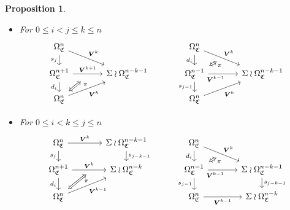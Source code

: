 \documentclass[a4paper,10pt
]{article}%
\numberwithin{equation}{section}
\numberwithin{figure}{section}
\newtheorem{proposition}[equation]{Proposition}%
\theoremstyle{definition} %
\newcommand{\1}{\ensuremath{\mathbbm 1}}%
\begin{document}
\begin{proposition}
\begin{itemize}
		\item[(DF3)]
		For $0\leq i < j \leq k \leq n$
		\begin{equation}
		\begin{tikzcd}[row sep = 12pt, column sep = 35pt]
		\Omega^n_{\mathfrak{C}}
		\arrow{dr}[swap,name=U]{}{\boldsymbol{V}^k} \arrow{d}[swap]{s_j} &
		&
		\Omega^n_{\mathfrak{C}}
		\arrow{dr}[swap,name=UUU]{}{\boldsymbol{V}^k} \arrow{d}[swap]{d_{i}} &
		\\
		|[alias=V]|
		\Omega^{n+1}_{\mathfrak{C}} \ar{r}{\boldsymbol{V}^{k+1}}[swap,name=UU]{} \arrow{d}[swap]{d_i}&
		\Sigma \wr \Omega^{n-k-1}_{\mathfrak{C}}
		&
		|[alias=VVV]|
		\Omega^{n-1}_{\mathfrak{C}} \ar{r}[near start, swap]{\boldsymbol{V}^{k-1}}[swap,name=UUUU]{} \ar{d}[swap]{s_{j-1}} &
		\Sigma \wr \Omega^{n-k-1}_{\mathfrak{C}}
		\\
		|[alias=VV]|
		\Omega^{n}_{\mathfrak{C}} \arrow{ur}[swap]{\boldsymbol{V}^k} &
		&
		|[alias=VVVV]|
		\Omega^{n}_{\mathfrak{C}} \arrow{ur}[swap]{\boldsymbol{V}^k} &
		\arrow[Leftrightarrow, from=VV, to=UU,shorten >=0.25cm,shorten <=0.05cm
		,swap,near end,"\pi"
		]
		\arrow[Leftrightarrow, from=VVV, to=UUU,shorten >=0.05cm,shorten <=0.05cm
		,swap,near end,"\pi"
		]
		\end{tikzcd}
		\end{equation}
		
		\item[(DF4)]
		For $0 \leq i < k \leq j \leq n$
		\begin{equation}
		\begin{tikzcd}[row sep = 12pt, column sep = 35pt]
		\Omega^n_{\mathfrak{C}}
		\arrow{r}[swap,name=U]{}{\boldsymbol{V}^k} \arrow{d}[swap]{s_j} &
		\Sigma \wr \Omega^{n-k-1}_{\mathfrak{C}} \ar{d}{s_{j-k-1}}
		&
		\Omega^n_{\mathfrak{C}}
		\arrow{dr}[swap,name=UUU]{}{\boldsymbol{V}^k} \arrow{d}[swap]{d_i} &
		\\
		|[alias=V]|
		\Omega^{n+1}_{\mathfrak{C}} \ar{r}{\boldsymbol{V}^{k}}[swap,name=UU]{} \arrow{d}[swap]{d_i}&
		\Sigma \wr \Omega^{n-k}_{\mathfrak{C}}
		&
		|[alias=VVV]|
		\Omega^{n-1}_{\mathfrak{C}} \ar{r}[near start, swap]{\boldsymbol{V}^{k-1}}[swap,name=UUUU]{} \ar{d}[swap]{s_{j-1}} &
		\Sigma \wr \Omega^{n-k-1}_{\mathfrak{C}} \ar{d}{s_{j-k-1}}
		\\
		|[alias=VV]|
		\Omega^{n}_{\mathfrak{C}} \arrow{ur}[swap]{\boldsymbol{V}^{k-1}} &
		&
		|[alias=VVVV]|
		\Omega^{n}_{\mathfrak{C}} \ar{r}[swap]{\boldsymbol{V}^{k-1}} &
		\Sigma \wr \Omega^{n-k}_{\mathfrak{C}}
		\arrow[Leftrightarrow, from=VV, to=UU,shorten >=0.05cm,shorten <=0.05cm
		,swap,near end,"\pi"
		]
		\arrow[Leftrightarrow, from=VVV, to=UUU,shorten >=0.05cm,shorten <=0.05cm
		,swap,near end,"\pi"
		]
		\end{tikzcd}
		\end{equation}
	\end{itemize}
\end{proposition}
\end{document}
